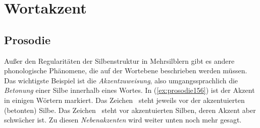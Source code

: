 \section{Wortakzent}
\label{sec:wortakzent}

\subsection{Prosodie}
\label{sec:prosodie}


Außer den Regularitäten der Silbenstruktur in Mehrsilblern gibt es andere phonologische Phänomene, die auf der Wortebene beschrieben werden müssen.
Das wichtigste Beispiel ist die \textit{Akzentzuweisung}, also umgangssprachlich die \textit{Betonung} einer Silbe innerhalb eines Wortes.
In (\ref{ex:prosodie156}) ist der Akzent in einigen Wörtern markiert.
Das Zeichen \Akz\ steht jeweils vor der akzentuierten (betonten) Silbe.
Das Zeichen \Nakz\ steht vor akzentuierten Silben, deren Akzent aber schwächer ist.
Zu diesen \textit{Nebenakzenten} wird weiter unten noch mehr gesagt.

\begin{exe}
  \ex\label{ex:prosodie156}
  \begin{xlist}
  \end{xlist}
\end{exe}

